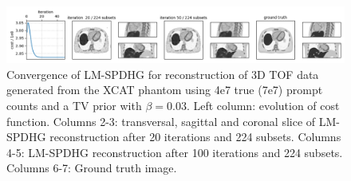 \begin{figure}
  \centering
    \includegraphics[width=1.0\textwidth]{./figs/xcat_TV_3e-2_4e7.png}
  \caption{Convergence of LM-SPDHG for reconstruction of 3D TOF data generated from the XCAT phantom
           using 4e7 true (7e7) prompt counts and a TV prior with $\beta = 0.03$.
           Left column: evolution of cost function. 
           Columns 2-3: transversal, sagittal and coronal
           slice of LM-SPDHG reconstruction after 20 iterations and 224 subsets.
           Columns 4-5: LM-SPDHG reconstruction after 100 iterations and 224 subsets.
           Columns 6-7: Ground truth image.}
  \label{fig:xcat}
\end{figure}


